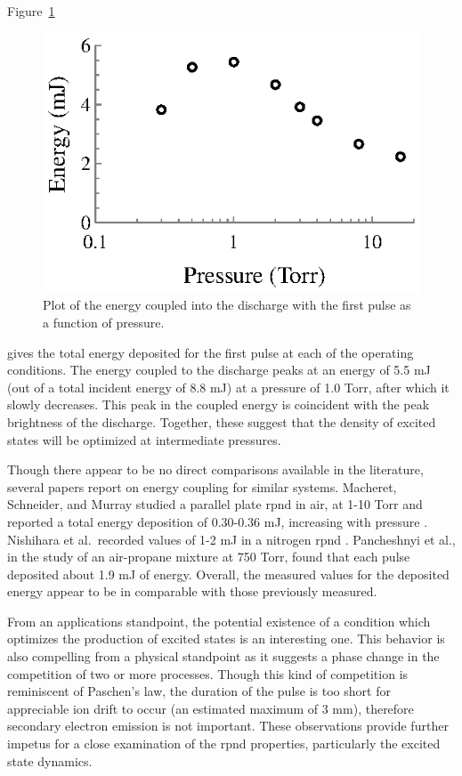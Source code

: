Figure~\ref{fig:energies}
\begin{figure}
  \centering
  \includegraphics{./chapters/experiment/figures/energies.eps}
  \caption{Plot of the energy coupled into the discharge with the first pulse as
  a function of pressure.}
  \label{fig:energies}
\end{figure}
gives the total energy deposited for the first pulse at each of the operating
conditions. The energy coupled to the discharge peaks at an energy of 5.5 mJ
(out of a total incident energy of 8.8 mJ) at a pressure of 1.0 Torr, after
which it slowly decreases. This peak in the coupled energy is coincident with
the peak brightness of the discharge. Together, these suggest that the density
of excited states will be optimized at intermediate pressures.

Though there appear to be no direct comparisons available in the literature,
several papers report on energy coupling for similar systems. Macheret,
Schneider, and Murray studied a parallel plate \acs{rpnd} in air, at 1-10 Torr
and reported a total energy deposition of 0.30-0.36 mJ, increasing with pressure
\cite{Macheret2006}. Nishihara et al.\ recorded values of 1-2 mJ in a nitrogen
\acs{rpnd} \cite{Nishihara2006}. Pancheshnyi et al., in the study of an
air-propane mixture at 750 Torr, found that each pulse deposited about 1.9 mJ of
energy. Overall, the measured values for the deposited energy appear to be in
comparable with those previously measured.

From an applications standpoint, the potential existence of a condition which
optimizes the production of excited states is an interesting one. This behavior
is also compelling from a physical standpoint as it suggests a phase change in
the competition of two or more processes. Though this kind of competition is
reminiscent of Paschen's law, the duration of the pulse is too short for
appreciable ion drift to occur (an estimated maximum of 3 mm), therefore
secondary electron emission is not important. These observations provide further
impetus for a close examination of the \acs{rpnd} properties, particularly the
excited state dynamics.
